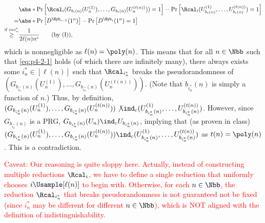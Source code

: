 \begin{answer}[b]
    \begin{align*}
        &\abs*{\Pr\left[\Rcal_i(G_{b_{i}(n)}(U_n^{(1)}),\ldots, G_{b_{i}(n)}(U_n^{(t(n))}))=1  \right] - \Pr\left[\Rcal_i(U_{b_{i}(n)}^{(1)},\ldots, U_{b_{i}(n)}^{(t(n))})=1  \right]}\\
        =& \abs*{\Pr\left[D^{\Hyb_{i-1}}(1^n) \right] - \Pr\left[D^{\Hyb_{i}}(1^n)=1  \right]}\\
        \stackrel{\textrm{if } i=i^\ast_n}\ge& \frac{1}{2\ell(n) n^c}
        \qquad \textrm{(by (I))},
    \end{align*}
    which is nonnegligible as $\ell(n)=\poly(n)$. This means that for all $n\in\Nbb$ such that \eqref{eq:p4-2-1} holds (of which there are infinitely many), there always exists some $i^\ast_n\in [\ell(n)]$ such that $\Rcal_{i^\ast_n}$ breaks the pseudorandomness of $(G_{b_{i^\ast_n}(n)}(U_n^{(1)}),\ldots, G_{b_{i^\ast_n}(n)}(U_n^{(t(n))}))$. (Note that $b_{i^\ast_n}(n)$ is simply a function of $n$.) Thus, by definition,  $(G_{b_{i^\ast_n}(n)}(U_n^{(1)}),\ldots, G_{b_{i^\ast_n}(n)}(U_n^{(t(n))})) \not\ind_c (U_{b_{i^\ast_n}(n)}^{(1)},\ldots, U_{b_{i^\ast_n}(n)}^{(t(n))})$. However, since $G_{b_{i^\ast_n}(n)}$ is a PRG, $G_{b_{i^\ast_n}(n)}(U_n) \ind_c U_{b_{i^\ast_n}(n)}$, implying that (as proven in class) $(G_{b_{i^\ast_n}(n)}(U_n^{(1)}),\ldots, G_{b_{i^\ast_n}(n)}(U_n^{(t(n))})) \ind_c (U_{b_{i^\ast_n}(n)}^{(1)},\ldots, U_{b_{i^\ast_n}(n)}^{(t(n))})$ as $t(n)=\poly(n)$. This is a contradiction.

    \begin{note}
        \textcolor{red}{Caveat: Our reasoning is quite sloppy here. Actually, instead of constructing multiple reductions $\Rcal_i$, we have to define a single reduction that uniformly chooses $i\Usample [\ell(n)]$ to begin with. Otherwise, for each $n\in\Nbb$, the reduction $\Rcal_{i^\ast_n}$ that breaks pseudorandomness is not guaranteed not be fixed (since $i^\ast_n$ may be different for different $n\in\Nbb$), which is NOT aligned with the definition of indistinguishability.}
    \end{note}


\end{answer}
